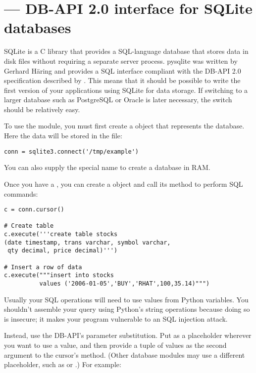 \section{ ---
         DB-API 2.0 interface for SQLite databases}


SQLite is a C library that provides a SQL-language database that
stores data in disk files without requiring a separate server process.
pysqlite was written by Gerhard H\"aring and provides a SQL interface
compliant with the DB-API 2.0 specification described by
. This means that it should be possible to write the first
version of your applications using SQLite for data storage.  If
switching to a larger database such as PostgreSQL or Oracle is
later necessary, the switch should be relatively easy.

To use the module, you must first create a  object
that represents the database.  Here the data will be stored in the 
 file:

\begin{verbatim}
conn = sqlite3.connect('/tmp/example')
\end{verbatim}

You can also supply the special name  to create
a database in RAM.

Once you have a , you can create a  
object and call its  method to perform SQL commands:

\begin{verbatim}
c = conn.cursor()

# Create table
c.execute('''create table stocks
(date timestamp, trans varchar, symbol varchar,
 qty decimal, price decimal)''')

# Insert a row of data
c.execute("""insert into stocks
          values ('2006-01-05','BUY','RHAT',100,35.14)""")
\end{verbatim}    

Usually your SQL operations will need to use values from Python
variables.  You shouldn't assemble your query using Python's string
operations because doing so is insecure; it makes your program
vulnerable to an SQL injection attack.  

Instead, use the DB-API's parameter substitution.  Put  as a
placeholder wherever you want to use a value, and then provide a tuple
of values as the second argument to the cursor's 
method.  (Other database modules may use a different placeholder,
such as  or .) For example:

